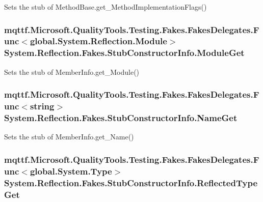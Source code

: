 Sets the stub of Method\-Base.\-get\-\_\-\-Method\-Implementation\-Flags()

\hypertarget{class_system_1_1_reflection_1_1_fakes_1_1_stub_constructor_info_a80fac9d293fdc2b2685bc8d0509dbe12}{
\subsubsection[{Module\-Get}]{\setlength{\rightskip}{0pt plus 5cm}mqttf.\-Microsoft.\-Quality\-Tools.\-Testing.\-Fakes.\-Fakes\-Delegates.\-Func$<$global.\-System.\-Reflection.\-Module$>$ System.\-Reflection.\-Fakes.\-Stub\-Constructor\-Info.\-Module\-Get}}\label{class_system_1_1_reflection_1_1_fakes_1_1_stub_constructor_info_a80fac9d293fdc2b2685bc8d0509dbe12}


Sets the stub of Member\-Info.\-get\-\_\-\-Module()

\hypertarget{class_system_1_1_reflection_1_1_fakes_1_1_stub_constructor_info_a3cc80bd81c4e411cb8428f1244877668}{
\subsubsection[{Name\-Get}]{\setlength{\rightskip}{0pt plus 5cm}mqttf.\-Microsoft.\-Quality\-Tools.\-Testing.\-Fakes.\-Fakes\-Delegates.\-Func$<$string$>$ System.\-Reflection.\-Fakes.\-Stub\-Constructor\-Info.\-Name\-Get}}\label{class_system_1_1_reflection_1_1_fakes_1_1_stub_constructor_info_a3cc80bd81c4e411cb8428f1244877668}


Sets the stub of Member\-Info.\-get\-\_\-\-Name()

\hypertarget{class_system_1_1_reflection_1_1_fakes_1_1_stub_constructor_info_aba098281b1978a3fcad330fa9feb7d7c}{
\subsubsection[{Reflected\-Type\-Get}]{\setlength{\rightskip}{0pt plus 5cm}mqttf.\-Microsoft.\-Quality\-Tools.\-Testing.\-Fakes.\-Fakes\-Delegates.\-Func$<$global.\-System.\-Type$>$ System.\-Reflection.\-Fakes.\-Stub\-Constructor\-Info.\-Reflected\-Type\-Get}}\label{class_system_1_1_reflection_1_1_fakes_1_1_stub_constructor_info_aba098281b1978a3fcad330fa9feb7d7c}


